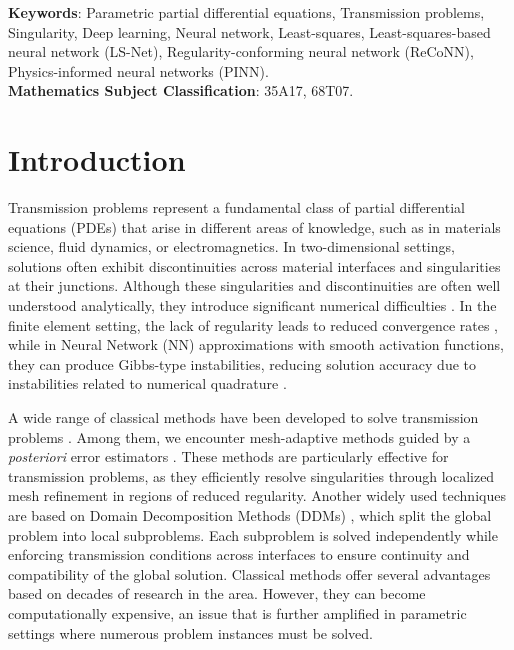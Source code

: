 \documentclass[oneside]{article}
\begin{document}
{\bf{Keywords}}: Parametric partial differential equations, Transmission problems, Singularity, Deep learning, Neural network, Least-squares, Least-squares-based neural network (LS-Net), Regularity-conforming neural network (ReCoNN), Physics-informed neural networks (PINN).\\
{\bf{Mathematics Subject Classification}}: 	35A17, 	68T07.



\section{Introduction}\label{sec_Introduction}

Transmission problems represent a fundamental class of partial differential equations (PDEs) that arise in different areas of knowledge, such as in materials science, fluid dynamics, or electromagnetics. In two-dimensional settings, solutions often exhibit discontinuities across material interfaces and singularities at their junctions. Although these singularities and discontinuities are often well understood analytically, they introduce significant numerical difficulties \cite{grisvard2011elliptic, li2000gradient}. In the finite element setting, the lack of regularity leads to reduced convergence rates \cite{babuvska1970finite}, while in Neural Network (NN) approximations with smooth activation functions, they can produce Gibbs-type instabilities, reducing solution accuracy due to instabilities related to numerical quadrature \cite{taylor2024regularity}.


A wide range of classical methods have been developed to solve transmission problems \cite{heinrich2003nitsche, bonnafont2024finite, brenner2003multigrid}.  Among them, we encounter mesh-adaptive methods guided by a {\it{posteriori}} error estimators \cite{babuvska1978posteriori, carstensen1997adaptive, lin2026adaptive}. These methods are particularly effective for transmission problems, as they efficiently resolve singularities through localized mesh refinement in regions of reduced regularity. Another widely used techniques are based on Domain Decomposition Methods (DDMs) \cite{glowinski1991fourth}, which split the global problem into local subproblems. Each subproblem is solved independently while enforcing transmission conditions across interfaces to ensure continuity and compatibility of the global solution.
Classical methods offer several advantages based on decades of research in the area. However, they can become computationally expensive, an issue that is further amplified in parametric settings where numerous problem instances must be solved.
\end{document}
